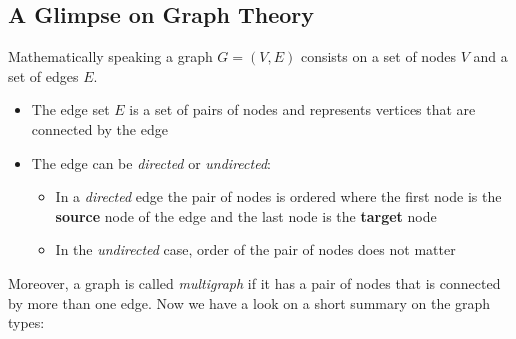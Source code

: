 \subsection{A Glimpse on Graph Theory}
Mathematically speaking a graph \(G = (V, E)\) consists on a set of nodes \(V\) and a set of edges \(E\).
\begin{itemize}
    \item The edge set \(E\) is a set of pairs of nodes and represents vertices that are connected by the edge
    \item The edge can be \textit{directed} or \textit{undirected}:
    \begin{itemize}
        \item In a \textit{directed} edge the pair of nodes is ordered where the first node is the \textbf{source} node of the edge and the last node is the \textbf{target} node
        \item In the \textit{undirected} case, order of the pair of nodes does not matter 
    \end{itemize}
\end{itemize}
Moreover, a graph is called \textit{multigraph} if it has a pair of nodes that is connected by more than one edge. Now we have a look on a short summary on the graph types:

